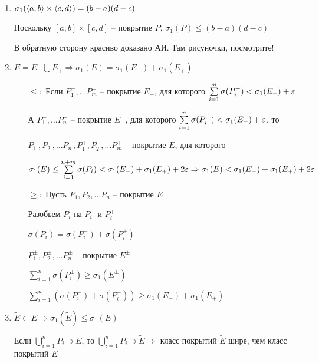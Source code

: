 \documentclass[12pt]{article}
\begin{document}
\begin{enumerate}
    \item $\sigma_1(\langle a, b \rangle \times \langle c, d \rangle) = (b - a)(d - c)$
    
    Поскольку $[a, b] \times [c, d]$ -- покрытие $P$, $\sigma_1(P) \leq (b - a)(d - c)$

    В обратную сторону красиво доказано АИ. Там рисуночки, посмотрите!

    \item $E = E_- \bigcup E_+ \Rightarrow \sigma_1(E) = \sigma_1(E_-) + \sigma_1(E_+)$
    
    \begin{itemize}
        \item[$\leq :$] Если $P_1^+, \ldots P_m^+$ -- покрытие $E_+$, для которого $\sum\limits_{i = 1}^m \sigma(P_i^+) < \sigma_1(E_+) + \varepsilon$
        
        А $P_1^-, \ldots P_n^-$ -- покрытие $E_-$, для которого $\sum\limits_{i = 1}^n \sigma(P_i^-) < \sigma_1(E_-) + \varepsilon$, то

        $P_1^-, P_2^-, \ldots P_n^-, P_1^+, P_2^+, \ldots P_m^+$ -- покрытие $E$, для которого 
        
        $\sigma_1(E) \leq \sum\limits_{i = 1}^{n + m} \sigma(P_i) < \sigma_1(E_-) + \sigma_1(E_+) + 2\varepsilon \Rightarrow \sigma_1(E) < \sigma_1(E_-) + \sigma_1(E_+) + 2\varepsilon$

        \item[$\geq :$] Пусть $P_1, P_2, \ldots P_n$ -- покрытие $E$
        
        Разобьем $P_i$ на $P_i^-$ и $P_i^+$

        $\sigma(P_i) = \sigma(P_i^-) + \sigma(P_i^+)$

        $P_1^\pm, P_2^\pm, \ldots P_n^\pm$ -- покрытие $E^\pm$

        $\sum\limits_{i = 1}^n \sigma(P_i^\pm) \geq \sigma_1(E^\pm)$

        $\sum\limits_{i = 1}^n (\sigma(P_i^-) + \sigma(P_i^+)) \geq \sigma_1(E_-) + \sigma_1(E_+)$
    \end{itemize}

    \item $\tilde{E} \subset E \Rightarrow \sigma_1(\tilde{E}) \leq \sigma_1(E)$
    
    Если $\bigcup\limits_{i = 1}^n P_i \supset E$, то $\bigcup\limits_{i = 1}^n P_i \supset \tilde{E} \Rightarrow$ класс покрытий $\tilde{E}$ шире, чем класс покрытий $E$
\end{enumerate}
\end{document}
